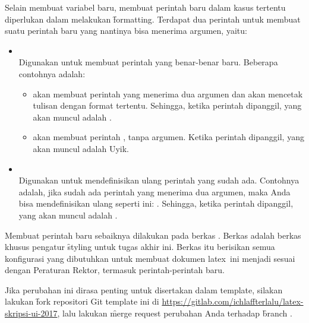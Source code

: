 Selain membuat variabel baru, membuat perintah baru dalam kasus tertentu diperlukan dalam melakukan \f{formatting}.
Terdapat dua perintah untuk membuat suatu perintah baru yang nantinya bisa menerima argumen, yaitu:
\begin{itemize}
	\item {} \\
	Digunakan untuk membuat perintah yang benar-benar baru. Beberapa contohnya adalah:
	\begin{itemize}
		\item {} akan membuat perintah  yang menerima dua argumen dan akan mencetak tulisan dengan format tertentu.
		Sehingga, ketika perintah  dipanggil, yang akan muncul adalah .
		\item {} akan membuat perintah , tanpa argumen.
		Ketika perintah  dipanggil, yang akan muncul adalah Uyik.
	\end{itemize}
	\item {} \\
	Digunakan untuk mendefinisikan ulang perintah yang sudah ada.
	Contohnya adalah, jika sudah ada perintah  yang menerima dua argumen, maka Anda bisa mendefinisikan ulang seperti ini: .
	Sehingga, ketika perintah  dipanggil, yang akan muncul adalah .
\end{itemize}

Membuat perintah baru sebaiknya dilakukan pada berkas .
Berkas  adalah berkas khusus pengatur \f{styling} untuk tugas akhir ini.
Berkas itu berisikan semua konfigurasi yang dibutuhkan untuk membuat dokumen \gls{latex}~ini menjadi sesuai dengan Peraturan Rektor, termasuk perintah-perintah baru.

Jika perubahan ini dirasa penting untuk disertakan dalam template, silakan lakukan \f{fork} repositori Git template ini di \url{https://gitlab.com/ichlaffterlalu/latex-skripsi-ui-2017}, lalu lakukan \f{merge request} perubahan Anda terhadap \f{branch} .


